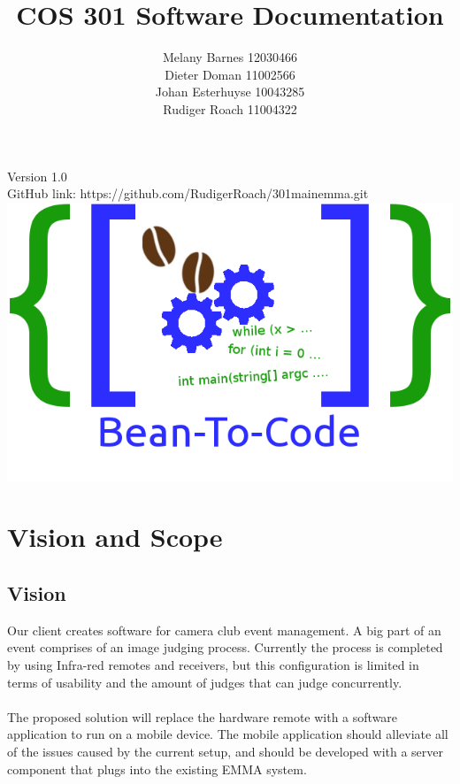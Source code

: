\documentclass[10pt,a4paper]{article}
\title{COS 301 Software Documentation}
\author{Melany Barnes 12030466 \\
		Dieter Doman 11002566 \\
		Johan Esterhuyse 10043285 \\
		Rudiger Roach 11004322 }
\date{}
\begin{document}
\maketitle
\begin{center}
Version 1.0 \\
GitHub link: https://github.com/RudigerRoach/301\textunderscore main\textunderscore emma.git \\
\vspace*{5\baselineskip}
\includegraphics[scale=0.5]{Pictures/Logo.png}
\end{center}
\pagebreak
\tableofcontents
\pagebreak
\section{Vision and Scope}

\subsection{Vision}
Our client creates software for camera club event management. A big part of an event comprises of an image judging process. Currently the process is completed by using Infra-red remotes and receivers, but this configuration is limited in terms of usability and the amount of judges that can judge concurrently.\\\\
The proposed solution will replace the hardware remote with a software application to run on a mobile device. The mobile application should alleviate all of the issues caused by the current setup, and should be developed with a server component that plugs into the existing EMMA system.  
\end{document}
